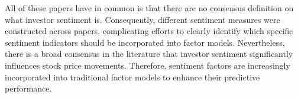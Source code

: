 All of these papers have in common is that there are no consensus definition on what investor sentiment is. Consequently, different sentiment measures were constructed across papers, complicating efforts to clearly identify which specific sentiment indicators should be incorporated into factor models. Nevertheless, there is a broad consensus in the literature that investor sentiment significantly influences stock price movements. Therefore, sentiment factors are increasingly incorporated into traditional factor models to enhance their predictive performance.



